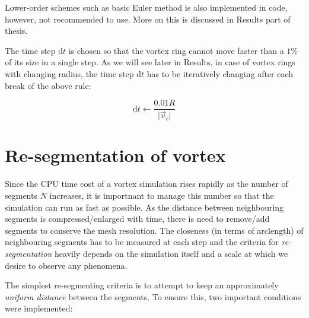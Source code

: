 Lower-order schemes such as basic Euler method is also implemented in code, however, not recommended to use. More on this is discussed in Results part of thesis.

The time step $\text{d}t$ is chosen so that the vortex ring cannot move faster than a $1\%$ of its size in a single step. As we will see later in Results, in case of vortex rings with changing radius, the time step $\text{d}t$ has to be iteratively changing after each break of the above rule:

\begin{equation}
\text{d}t \leftarrow \frac{0.01 R}{\vert \vec{v}_c \vert}
\end{equation}

\section{Re-segmentation of vortex}

Since the CPU time cost of a vortex simulation rises rapidly as the number of segments $N$ increases, it is importnant to manage this number so that the simulation can run as fast as possible. As the distance between neighbouring segments is compressed/enlarged with time, there is need to remove/add segments to conserve the mesh resolution. The closeness (in terms of arclength) of neighbouring segments has to be measured at each step and the criteria for \textit{re-segmentation} heavily depends on the simulation itself and a scale at which we desire to observe any phenomena.

The simplest re-segmenting criteria is to attempt to keep an approximately \textit{uniform distance} between the segments. To ensure  this, two important conditions were implemented:

